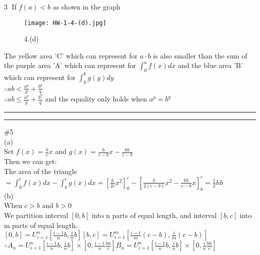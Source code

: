 \documentclass{article}
\begin{document}
\textcircled{3} If $f(a)<b$ as shown in the graph\\

\begin{figure}[H]
  \centering
  \texttt{[image: HW-1-4-(d).jpg]}\\
  \caption*{4.(d)}
\end{figure}

The yellow area 'C' which can represent for $a\cdot b$ is also smaller than the sum of the purple area 'A' which can represent for $\displaystyle\int_{0}^{a}f(x)dx$ and the blue area 'B' which can represent for $\displaystyle\int_{0}^{b}g(y)dy$\\

$\therefore$\qquad$\displaystyle ab<\frac{a^p}{p}+\frac{b^q}{q}$\\

$\therefore$\qquad$\displaystyle ab\leq\frac{a^p}{p}+\frac{b^q}{q}$ and the equality only holds when $a^p=b^q$\\

\hrule
\vskip 1mm
\hrule
\vskip 0.5cm

\textcolor[rgb]{0.00,0.00,0.50}{\#5}\\

(a)\\

Set $f(x)=\displaystyle\frac{h}{c}x$ and $g(x)=\frac{h}{c-b}x-\frac{bh}{c-b}$\\

Then we can get:\\

The area of the triangle $=\displaystyle\int_{0}^{c}f(x)dx-\int_{b}^{c}g(x)dx=\left[\frac{h}{2c}x^2\right]_{0}^{c}-\left[\frac{h}{2(c-b)}x^2-\frac{bh}{c-b}x\right]_{b}^{c}=\frac{1}{2}hb$\\

(b)\\

When $c>b$ and $b>0$\\

We partition interval $[0,b]$ into n parts of equal length, and interval $[b,c]$ into m parts of equal length.\\

$\displaystyle[0,b]=U_{i=1}^{n}\left[\frac{i-1}{n}b,\frac{i}{n}b\right]$\qquad\qquad$\displaystyle[b,c]=U_{i=1}^{m}\left[\frac{i-1}{m}(c-b),\frac{i}{m}(c-b)\right]$\\

$\therefore$\qquad$A_n=U_{i=1}^{n}\left[\frac{i-1}{n}b,\frac{i}{n}b\right]\times\left[0,\frac{i-1}{n}\frac{bh}{c}\right]$\qquad$B_n=U_{i=1}^{n}\left[\frac{i-1}{n}b,\frac{i}{n}b\right]\times\left[0,\frac{i}{n}\frac{bh}{c}\right]$\\
\end{document}

